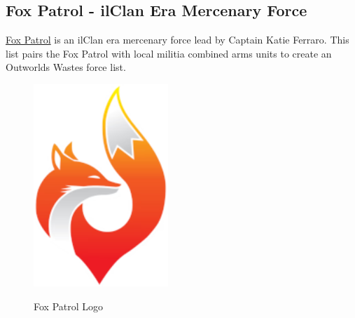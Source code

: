 \subsection{Fox Patrol - ilClan Era Mercenary Force}

\href{https://www.sarna.net/wiki/Fox_Patrol}{Fox Patrol} is an ilClan era mercenary force lead by Captain Katie Ferraro.
This list pairs the Fox Patrol with local militia combined arms units to create an Outworlds Wastes force list.

\begin{figure}[!h]
  \centering
  \includegraphics[alt='Fox Patrol Logo', width=2in, height=3in]{img/Fox-Patrol.png}
  \caption*{Fox Patrol Logo}
\end{figure}

